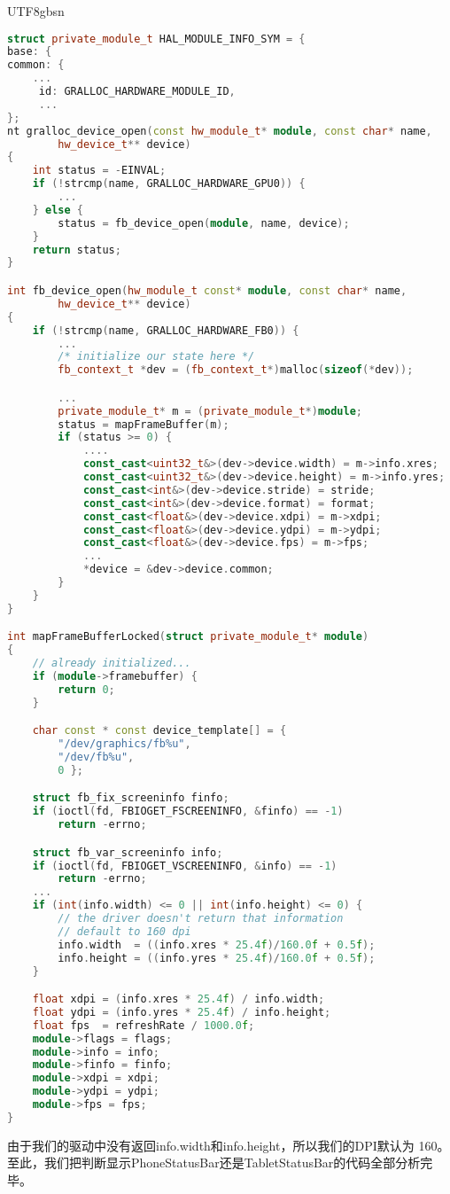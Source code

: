 \documentclass[a4paper,11pt]{article}
\begin{document}
\begin{CJK*}{UTF8}{gbsn}
\begin{enumerate}
\begin{lstlisting}[language=C++]
struct private_module_t HAL_MODULE_INFO_SYM = {
base: {
common: {
    ...
     id: GRALLOC_HARDWARE_MODULE_ID,
     ...
};
nt gralloc_device_open(const hw_module_t* module, const char* name,
        hw_device_t** device)
{
    int status = -EINVAL;
    if (!strcmp(name, GRALLOC_HARDWARE_GPU0)) {
        ...
    } else {
        status = fb_device_open(module, name, device);
    }
    return status;
}

int fb_device_open(hw_module_t const* module, const char* name,
        hw_device_t** device)
{
    if (!strcmp(name, GRALLOC_HARDWARE_FB0)) {
        ...
        /* initialize our state here */
        fb_context_t *dev = (fb_context_t*)malloc(sizeof(*dev));

        ...        
        private_module_t* m = (private_module_t*)module;
        status = mapFrameBuffer(m);
        if (status >= 0) {
            ....
            const_cast<uint32_t&>(dev->device.width) = m->info.xres;
            const_cast<uint32_t&>(dev->device.height) = m->info.yres;
            const_cast<int&>(dev->device.stride) = stride;
            const_cast<int&>(dev->device.format) = format;
            const_cast<float&>(dev->device.xdpi) = m->xdpi;
            const_cast<float&>(dev->device.ydpi) = m->ydpi;
            const_cast<float&>(dev->device.fps) = m->fps;
            ...
            *device = &dev->device.common;
        }
    }
}

int mapFrameBufferLocked(struct private_module_t* module)
{
    // already initialized...
    if (module->framebuffer) {
        return 0;
    }

    char const * const device_template[] = {
        "/dev/graphics/fb%u",
        "/dev/fb%u",                                                                                                                                                                      
        0 };

    struct fb_fix_screeninfo finfo;
    if (ioctl(fd, FBIOGET_FSCREENINFO, &finfo) == -1)
        return -errno;

    struct fb_var_screeninfo info;
    if (ioctl(fd, FBIOGET_VSCREENINFO, &info) == -1)
        return -errno;
    ...
    if (int(info.width) <= 0 || int(info.height) <= 0) {
        // the driver doesn't return that information
        // default to 160 dpi
        info.width  = ((info.xres * 25.4f)/160.0f + 0.5f);
        info.height = ((info.yres * 25.4f)/160.0f + 0.5f);
    }

    float xdpi = (info.xres * 25.4f) / info.width;
    float ydpi = (info.yres * 25.4f) / info.height;
    float fps  = refreshRate / 1000.0f;
    module->flags = flags;
    module->info = info;
    module->finfo = finfo;
    module->xdpi = xdpi;
    module->ydpi = ydpi;
    module->fps = fps;
}
\end{lstlisting}
        由于我们的驱动中没有返回info.width和info.height，所以我们的DPI默认为
        160。\\
        至此，我们把判断显示PhoneStatusBar还是TabletStatusBar的代码全部分析完毕。
    \end{enumerate}



\end{CJK*}
\end{document}
